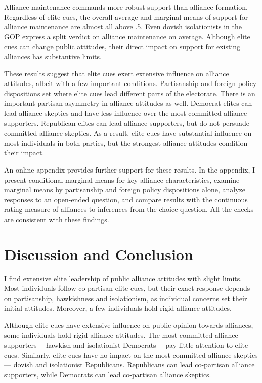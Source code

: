 \documentclass[12pt]{article}
\begin{document}
Alliance maintenance commands more robust support than alliance formation. 
Regardless of elite cues, the overall average and marginal means of support for alliance maintenance are almost all above .5. 
Even dovish isolationists in the GOP express a split verdict on alliance maintenance on average.
Although elite cues can change public attitudes, their direct impact on support for existing alliances has substantive limits.


These results suggest that elite cues exert extensive influence on alliance attitudes, albeit with a few important conditions.
Partisanship and foreign policy dispositions set where elite cues lead different parts of the electorate. 
There is an important partisan asymmetry in alliance attitudes as well. 
Democrat elites can lead alliance skeptics and have less influence over the most committed alliance supporters. 
Republican elites can lead alliance supporters, but do not persuade committed alliance skeptics. 
As a result, elite cues have substantial influence on most individuals in both parties, but the strongest alliance attitudes condition their impact. 


An online appendix provides further support for these results. 
In the appendix, I present conditional marginal means for key alliance characteristics, examine marginal means by partisanship and foreign policy dispositions alone, analyze responses to an open-ended question, and compare results with the continuous rating measure of alliances to inferences from the choice question.
All the checks are consistent with these findings. 


\section{Discussion and Conclusion} 


I find extensive elite leadership of public alliance attitudes with slight limits.  
Most individuals follow co-partisan elite cues, but their exact response depends on partisanship, hawkishness and isolationism, as individual concerns set their initial attitudes.
Moreover, a few individuals hold rigid alliance attitudes. 


Although elite cues have extensive influence on public opinion towards alliances, some individuals hold rigid alliance attitudes. 
The most committed alliance supporters ---hawkish and isolationist Democrats--- pay little attention to elite cues.
Similarly, elite cues have no impact on the most committed alliance skeptics --- dovish and isolationist Republicans. 
Republicans can lead co-partisan alliance supporters, while Democrats can lead co-partisan alliance skeptics. 
\end{document}
